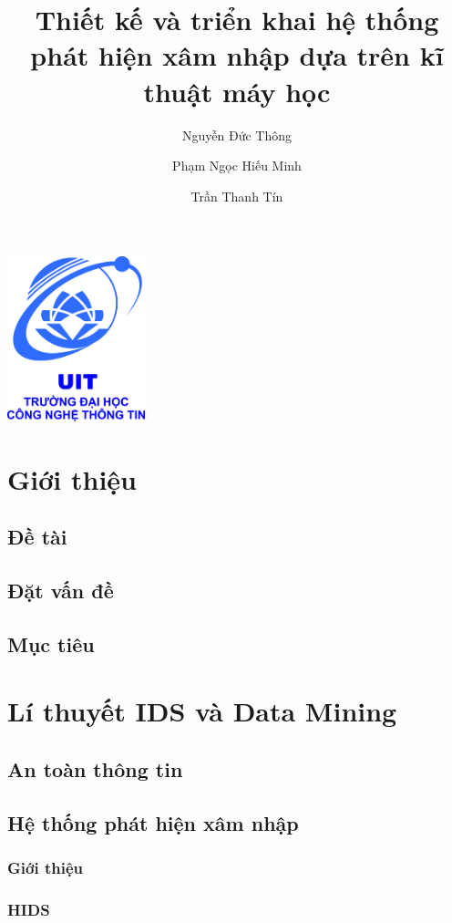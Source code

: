 \documentclass{article}
\title{Thiết kế và triển khai hệ thống phát hiện xâm nhập dựa trên kĩ thuật máy học}
\author{
    Nguyễn Đức Thông
    \and
    Phạm Ngọc Hiếu Minh
    \and
    Trần Thanh Tín
}
\begin{document}
    \maketitle
    \centering
    \includegraphics[width=4cm]{logo}
    \newpage
    \tableofcontents
    \newpage

    \begin{flushleft}
        \section{Giới thiệu}
        \subsection{Đề tài}
        \subsection{Đặt vấn đề}
        \subsection{Mục tiêu}
        \newpage
        \section{Lí thuyết IDS và Data Mining}
        \subsection{An toàn thông tin}
        \subsection{Hệ thống phát hiện xâm nhập}
        \subsubsection{Giới thiệu}
        \subsubsection{HIDS}

\end{flushleft}
\end{document}

